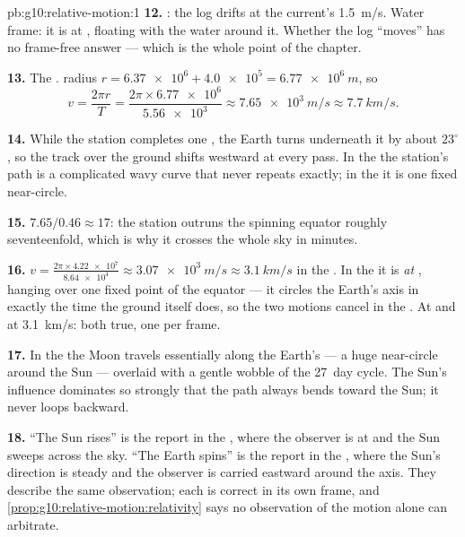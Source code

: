 \begin{solution}{pb:g10:relative-motion:1}
\textbf{12.} : the log drifts at the current's
\qty{1.5}{m/s}. Water frame: it is at , floating with the water
around it. Whether the log ``moves'' has no frame-free answer --- which
is the whole point of the chapter.

\textbf{13.} The .  radius
$r = \num{6.37e6} + \num{4.0e5} = \qty{6.77e6}{m}$, so
\[
v = \frac{2\pi r}{T} = \frac{2\pi \times \num{6.77e6}}{\num{5.56e3}}
\approx \qty{7.65e3}{m/s} \approx \qty{7.7}{km/s}.
\]

\textbf{14.} While the station completes one , the Earth turns
underneath it by about $23^\circ$, so the track over the ground shifts
westward at every pass. In the  the station's path is a
complicated wavy curve that never repeats exactly; in the  it is one fixed near-circle.

\textbf{15.} $7.65 / 0.46 \approx 17$: the station outruns the spinning
equator roughly seventeenfold, which is why it crosses the whole sky in
minutes.

\textbf{16.} $v = \frac{2\pi \times \num{4.22e7}}{\num{8.64e4}}
\approx \qty{3.07e3}{m/s} \approx \qty{3.1}{km/s}$ in the . In the  it is \emph{at }, hanging over one fixed
point of the equator --- it circles the Earth's axis in exactly the
time the ground itself does, so the two motions cancel in the . At  and at \qty{3.1}{km/s}: both true, one per frame.

\textbf{17.} In the  the Moon travels essentially
along the Earth's  --- a huge near-circle around the Sun ---
overlaid with a gentle wobble of the \qty{27}{day} cycle. The Sun's
influence dominates so strongly that the path always bends toward the
Sun; it never loops backward.

\textbf{18.} ``The Sun rises'' is the report in the , where
the observer is at  and the Sun sweeps across the sky. ``The Earth
spins'' is the report in the , where the Sun's
direction is steady and the observer is carried eastward around the
axis. They describe the same observation; each is correct in its own
frame, and \cref{prop:g10:relative-motion:relativity} says no
observation of the motion alone can arbitrate.


\end{solution}
